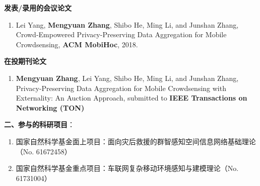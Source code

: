 \textbf{{发表/录用的会议论文}}
\begin{enumerate}%

\item Lei Yang, \textbf{Mengyuan Zhang},  Shibo He, Ming Li, and Junshan Zhang, Crowd-Empowered Privacy-Preserving Data Aggregation for Mobile Crowdsensing, \textbf{ACM MobiHoc}, 2018.
\end{enumerate}

\textbf{{在投期刊论文}}
\begin{enumerate}
\item \textbf{Mengyuan Zhang}, Lei Yang, Shibo He, Ming Li, and Junshan Zhang, Privacy-Preserving Data Aggregation for Mobile Crowdsensing with Externality: An Auction Approach, submitted to \textbf{IEEE Transactions on Networking (TON)}
\end{enumerate}




\textbf{二、参与的科研项目}：

\begin{enumerate}

\item 国家自然科学基金面上项目：面向灾后救援的群智感知空间信息网络基础理论（No.
61672458）
\item 国家自然科学基金重点项目：车联网复杂移动环境感知与建模理论（No. 61731004）

\end{enumerate}

